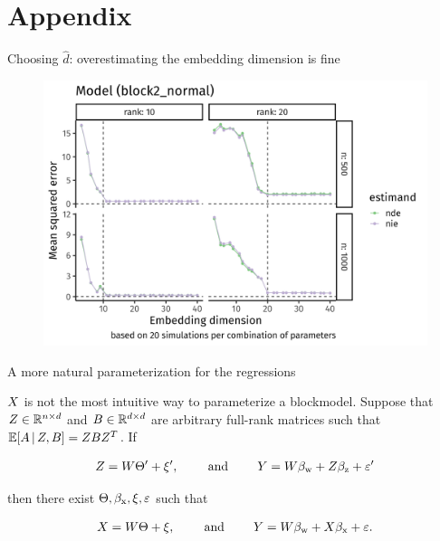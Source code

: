 \documentclass{beamer}
\theoremstyle{remark}
\begin{document}
\section{Appendix}

\begin{frame}{Choosing $\widehat{d}$: overestimating the embedding dimension is fine}

    \centering

    \begin{figure}
        \includegraphics[width=\textwidth]{figures/misspecification/block2_normal_misspecification_loss_average.png}
    \end{figure}

\end{frame}

\begin{frame}{A more natural parameterization for the regressions}

    $X$ is not the most intuitive way to parameterize a blockmodel. Suppose that $Z \in \mathbb{R}^{n \times d}$ and $B \in \mathbb{R}^{d \times d}$ are arbitrary full-rank matrices such that $\E[Z, B]{A} = Z B Z^T$. If

    \begin{align*}
        Z = W \Theta' + \xi',                     \qquad \text{ and } \qquad
        Y  = W \beta_\text{w} + Z \beta_\text{z} + \varepsilon'
    \end{align*}

    \noindent then there exist $\Theta, \beta_\text{x}, \xi, \varepsilon$ such that

    \begin{align*}
        X = W \Theta + \xi,                     \qquad \text{ and } \qquad
        Y  = W \beta_\text{w} + X \beta_\text{x} + \varepsilon.
    \end{align*}

\end{frame}
\end{document}
